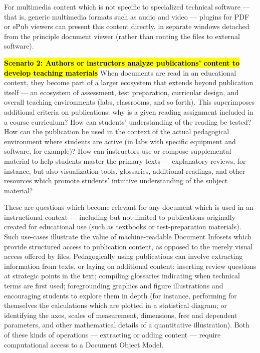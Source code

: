 \documentclass[10pt,letterpaper]{article}
\newcommand{\pseudoIndent}{

\vspace{10pt}\hspace*{38pt}}
\newcommand{\LPF}{\resizebox{!}{8pt}{\AcronymText{LPF}}}
\newcommand{\textscc}[1]{{\color{orr!35!black}{{%
						\fontfamily{Cabin-TLF}\fontseries{b}\selectfont{\textsc{\scriptsize{#1}}}}}}}
\newcommand{\AcronymText}[1]{{\textscc{#1}}}
\newcommand{\PDF}{\resizebox{!}{8pt}{\AcronymText{PDF}}}
\newenvironment{mldescription}{\vspace{1em}%
  \begin{addmargin}[4pt]{1em}
    \setlength{\parindent}{-1em}%
    \newcommand*{\mlitem}[1][]{\vspace{5pt}\par\medskip%
\hl{\textbf{##1}}\quad}\indent
}{%
  \end{addmargin}
  \medskip
}
\begin{document}
{{{\begin{mldescription}
\pseudoIndent{} For multimedia content which is 
not specific to specialized technical software 
--- that is, generic multimedia formats such as 
audio and video --- 
\LPF{} plugins for PDF or ePub viewers can present 
this content directly, in separate windows detached 
from the principle document viewer (rather than 
routing the files to external software).   

\mlitem[Scenario 2: Authors or instructors 
analyze publications' content to develop teaching 
materials]  When documents are read in an 
educational context, they become part of a 
larger ecosystem that extends beyond publication 
itself --- an ecosystem of assessment, test preparation, 
curricular design, and overall teaching environments 
(labs, classrooms, and so forth).  This superimposes 
additional criteria on publications: why is a given 
reading assignment included in a course curriculum?  
How can students' understanding of the reading be 
tested?  How can the publication be used in the 
context of the actual pedagogical environment where 
students are active (in labs with specific 
equipment and software, for example)?  How can 
instructors use or compose supplemental material to 
help students master the primary texts 
--- explanatory reviews, for instance, but also 
visualization tools, glossaries, additional readings, 
and other resources which promote students' intuitive 
understanding of the subject material?    

\pseudoIndent{} These are questions which become 
relevant for any document which is used in an 
instructional context --- including but not limited 
to publications originally created for 
educational use (such as textbooks or test-preparation 
materials).  Such use-cases illustrate the value of 
machine-readable Document Infosets which provide 
structured access to publication content, as opposed 
to the merely visual access offered by \PDF{} files.  
Pedagogically using publications can involve extracting 
information from texts, or laying on additional 
content: inserting review questions at strategic 
points in the text; compiling glossaries indicating 
when technical terms are first used; foregrounding 
graphics and figure illustrations and encouraging 
students to explore them in depth 
(for instance, performing for themselves the calculations 
which are plotted in a statistical diagram; or 
identifying the axes, scales of measurement, dimensions, 
free and dependent parameters, and other mathematical 
details of a quantitative illustration).  Both of 
these kinds of operations --- extracting or adding 
content --- require computational access to a 
Document Object Model.    
 

\end{mldescription}}}}
\end{document}
